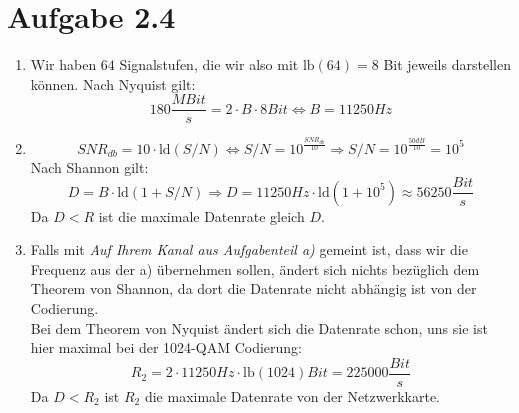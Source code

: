 \documentclass[12pt, a4paper]{article}
\begin{document}
\section*{Aufgabe 2.4}
\begin{enumerate}[label=\alph*)]
	\item	Wir haben $64$ Signalstufen, die wir also mit $\text{lb}(64) = 8$ Bit jeweils darstellen können. Nach Nyquist gilt:
			$$180 \frac{MBit}{s} = 2 \cdot B \cdot 8 Bit \Leftrightarrow B = 11250 Hz$$
	\item	$$SNR_{db} = 10 \cdot \text{ld}(S/N) \Leftrightarrow S/N = 10^{\frac{SNR_{db}}{10}} \Rightarrow S/N = 10^{\frac{50 dB}{10}} = 10^5$$
			Nach Shannon gilt:
			$$D = B \cdot \text{ld}(1 + S/N) \Rightarrow D = 11250 Hz \cdot \text{ld}(1 + 10^5) \approx 56250 \frac{Bit}{s}$$
			Da $D < R$ ist die maximale Datenrate gleich $D$.
	\item	Falls mit \textit{Auf Ihrem Kanal aus Aufgabenteil a)} gemeint ist, dass wir die Frequenz aus der a) übernehmen sollen, ändert sich nichts bezüglich dem Theorem von Shannon, da dort die Datenrate nicht abhängig ist von der Codierung.\\
			Bei dem Theorem von Nyquist ändert sich die Datenrate schon, uns sie ist hier maximal bei der 1024-QAM Codierung:
			$$R_2 = 2 \cdot 11250 Hz \cdot \text{lb}(1024) Bit = 225000 \frac{Bit}{s}$$
			Da $D < R_2$ ist $R_2$ die maximale Datenrate von der Netzwerkkarte.
\end{enumerate}
\end{document}
